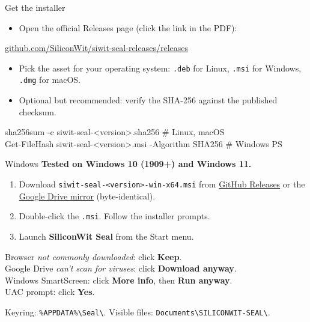 \documentclass[aspectratio=169,11pt]{beamer}
\newcommand{\releasesurl}{https://github.com/SiliconWit/siwit-seal-releases/releases}
\newcommand{\winmirror}{https://drive.google.com/file/d/1\_sCuSeqJO8JbBs8dWMn0VtlgerIXMrI3/view?usp=sharing}
\begin{document}
\begin{frame}{Get the installer}
  \begin{itemize}
    \item Open the official Releases page (click the link in the PDF):
  \end{itemize}
  \begin{cmdbox}
\href{\releasesurl}{github.com/SiliconWit/siwit-seal-releases/releases}
  \end{cmdbox}
  \begin{itemize}
    \item Pick the asset for your operating system: \texttt{.deb} for Linux, \texttt{.msi} for Windows, \texttt{.dmg} for macOS.
    \item Optional but recommended: verify the SHA-256 against the published checksum.
  \end{itemize}
  \begin{cmdbox}
sha256sum -c siwit-seal-<version>.sha256                  \# Linux, macOS\\
Get-FileHash siwit-seal-<version>.msi -Algorithm SHA256   \# Windows PS
  \end{cmdbox}
\end{frame}

\begin{frame}{Windows}
  \textbf{Tested on Windows 10 (1909+) and Windows 11.}
  \begin{enumerate}
    \item Download \texttt{siwit-seal-<version>-win-x64.msi} from \href{\releasesurl}{GitHub Releases} or the \href{\winmirror}{Google Drive mirror} (byte-identical).
    \item Double-click the \texttt{.msi}. Follow the installer prompts.
    \item Launch \textbf{SiliconWit Seal} from the Start menu.
  \end{enumerate}
  \begin{notebox}
    Browser \emph{not commonly downloaded}: click \textbf{Keep}.\\
    Google Drive \emph{can't scan for viruses}: click \textbf{Download anyway}.\\
    Windows SmartScreen: click \textbf{More info}, then \textbf{Run anyway}.\\
    UAC prompt: click \textbf{Yes}.
  \end{notebox}
  \vspace{0.2em}
  \small\textcolor{swMute}{Keyring: \texttt{\%APPDATA\%\textbackslash Seal\textbackslash}. Visible files: \texttt{Documents\textbackslash SILICONWIT-SEAL\textbackslash}.}
\end{frame}
\end{document}
